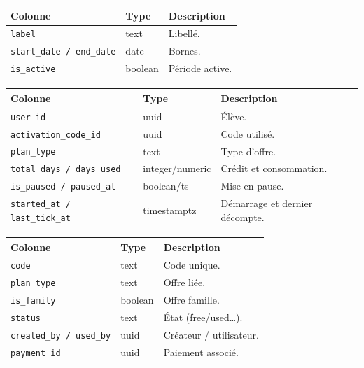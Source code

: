 \begin{longtable}{p{3.6cm}p{2.6cm}p{8cm}}
\toprule \textbf{Colonne} & \textbf{Type} & \textbf{Description} \\ \midrule \endhead
\texttt{label} & text & Libellé. \\
\texttt{start\_date / end\_date} & date & Bornes. \\
\texttt{is\_active} & boolean & Période active. \\
\bottomrule
\end{longtable}

\begin{longtable}{p{3.6cm}p{2.6cm}p{8cm}}
\toprule \textbf{Colonne} & \textbf{Type} & \textbf{Description} \\ \midrule \endhead
\texttt{user\_id} & uuid & Élève. \\
\texttt{activation\_code\_id} & uuid & Code utilisé. \\
\texttt{plan\_type} & text & Type d'offre. \\
\texttt{total\_days / days\_used} & integer/numeric & Crédit et consommation. \\
\texttt{is\_paused / paused\_at} & boolean/ts & Mise en pause. \\
\texttt{started\_at / last\_tick\_at} & timestamptz & Démarrage et dernier décompte. \\
\bottomrule
\end{longtable}

\begin{longtable}{p{3.6cm}p{2.6cm}p{8cm}}
\toprule \textbf{Colonne} & \textbf{Type} & \textbf{Description} \\ \midrule \endhead
\texttt{code} & text & Code unique. \\
\texttt{plan\_type} & text & Offre liée. \\
\texttt{is\_family} & boolean & Offre famille. \\
\texttt{status} & text & État (free/used\dots). \\
\texttt{created\_by / used\_by} & uuid & Créateur / utilisateur. \\
\texttt{payment\_id} & uuid & Paiement associé. \\
\bottomrule
\end{longtable}

